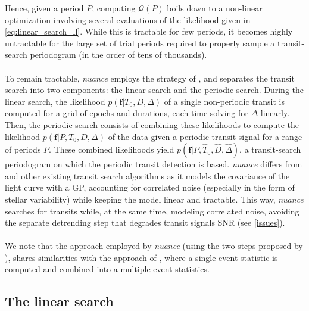 \documentclass[modern]{aastex631}
\newcommand{\nuancemethod}{\textit{nuance}}
\begin{document}
Hence, given a period $P$, computing $\mathcal{Q}(P)$ boils down to a non-linear optimization involving several evaluations of the likelihood given in \autoref{eq:linear_search_ll}. While this is tractable for few periods, it becomes highly untractable for the large set of trial periods required to properly sample a transit-search periodogram (in the order of tens of thousands).\\\\
To remain tractable, \nuancemethod{} employs the strategy of \cite{foreman2016}, and separates the transit search into two components: the linear search and the periodic search. During the linear search, the likelihood $p(\bm{f} \vert T_0, D, \Delta)$ of a single non-periodic transit is computed for a grid of epochs and durations, each time solving for $\Delta$ linearly. Then, the periodic search consists of combining these likelihoods to compute the likelihood $p(\bm{f} \vert P, T_0, D, \Delta)$ of the data given a periodic transit signal for a range of periods $P$. These combined likelihoods yield $p(\bm{f} \vert P, \hat T_0 ,\hat D, \hat \Delta)$, a transit-search periodogram on which the periodic transit detection is based. \nuancemethod{} differs from \cite{foreman2016} and other existing transit search algorithms as it models the covariance of the light curve with a GP, accounting for correlated noise (especially in the form of stellar variability) while keeping the model linear and tractable. This way, \nuancemethod{} searches for transits while, at the same time, modeling correlated noise, avoiding the separate detrending step that degrades transit signals SNR (see \autoref{issues}).\\\\
We note that the approach employed by \nuancemethod{} (using the two steps proposed by \citealt{foreman2016}), shares similarities with the approach of \cite{Jenkins2010}, where a single event statistic is computed and combined into a multiple event statistics.

\subsection{The linear search}\label{linear_search}
\end{document}
